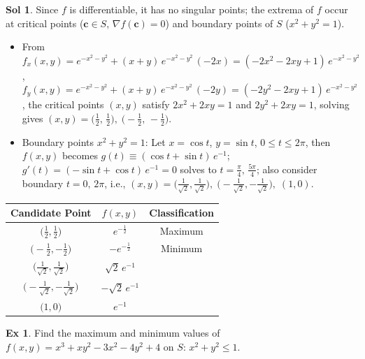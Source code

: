 \documentclass[12pt]{extarticle}
\newcommand{\ds}{\displaystyle}
\theoremstyle{definition}
\newtheorem*{ex}{Ex}
\newtheorem*{sol}{Sol}
\newcommand{\vc}{\mathbf{c}}
\begin{document}
\begin{sol}
  Since $f$ is differentiable, it has no singular points; the extrema of $f$ occur at critical points ($\vc\in S,\,\nabla f(\vc) = 0$) and boundary points of $S$ ($x^2 + y^2 = 1$). 
  \begin{itemize}\setlength\itemsep{0em}
    \item From $\ds f_x(x, y) = e^{-x^2 - y^2} + (x + y)\,e^{-x^2 - y^2}\,(-2x) = (-2 x^2 - 2xy + 1)\,e^{-x^2 - y^2}$, $\ds f_y(x, y) = e^{-x^2 - y^2} + (x + y)\,e^{-x^2 - y^2}\,(-2y) = (-2 y^2 - 2xy + 1)\,e^{-x^2 - y^2}$, the critical points $(x, y)$ satisfy $\ds 2x^2 + 2xy = 1$ and $2y^2 + 2xy = 1$, solving gives $(x, y) = \big(\frac{1}{2},\,\frac{1}{2}\big),\;\big(-\frac{1}{2},\,-\frac{1}{2}\big)$. 
    \item Boundary points $x^2 + y^2 = 1$: Let $x = \cos t$, $y = \sin t$, $0\leqslant t\leqslant 2\pi$, then $f(x, y)$ becomes $\ds g(t)\equiv(\cos t + \sin t)\,e^{-1}$; $g'(t) = (-\sin t + \cos t)\,e^{-1} = 0$ solves to $t = \frac{\pi}{4},\,\frac{5\pi}{4}$; also consider boundary $t = 0,\,2\pi$, i.e., $(x, y) = \big(\frac{1}{\sqrt{2}}, \frac{1}{\sqrt{2}}\big),\;\big(-\frac{1}{\sqrt{2}}, -\frac{1}{\sqrt{2}}\big),\;(1, 0)$.  
  \end{itemize}
  \begin{center}
  \renewcommand{\arraystretch}{1.3}
  \begin{tabular}{ccc}
    \toprule
    Candidate Point & $f(x, y)$ & Classification \\    
    \midrule
    $\big(\frac{1}{2}, \frac{1}{2}\big)$  & $e^{-\frac{1}{2}}$ & Maximum \\ 
    $\big(-\frac{1}{2}, -\frac{1}{2}\big)$  & $-e^{-\frac{1}{2}}$ & Minimum \\ 
    $\big(\frac{1}{\sqrt{2}}, \frac{1}{\sqrt{2}}\big)$ & $\sqrt{2}\,e^{-1}$ &  \\ 
    $\big(-\frac{1}{\sqrt{2}}, -\frac{1}{\sqrt{2}}\big)$ & $-\sqrt{2}\,e^{-1}$ & \\ 
    $\big(1, 0\big)$ & $e^{-1}$ & \\ \bottomrule
  \end{tabular}
  \renewcommand{\arraystretch}{1.0}
  \end{center}
\end{sol}

\begin{ex}
  Find the maximum and minimum values of $\ds f(x, y) = x^3 + xy^2 - 3x^2 - 4y^2 + 4$ on $S:\,x^2 + y^2 \leqslant 1$. 
\end{ex}
\end{document}
